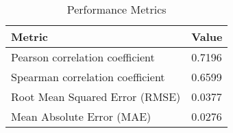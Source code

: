 \documentclass{article}
\begin{document}
\begin{table}[h!]
\centering
\begin{tabular}{ll}
\toprule
Metric & Value \\
\midrule
Pearson correlation coefficient & 0.7196 \\
Spearman correlation coefficient & 0.6599 \\
Root Mean Squared Error (RMSE) & 0.0377 \\
Mean Absolute Error (MAE) & 0.0276 \\
\bottomrule
\end{tabular}
\caption{Performance Metrics}
\label{tab:metrics}
\end{table}
\end{document}
